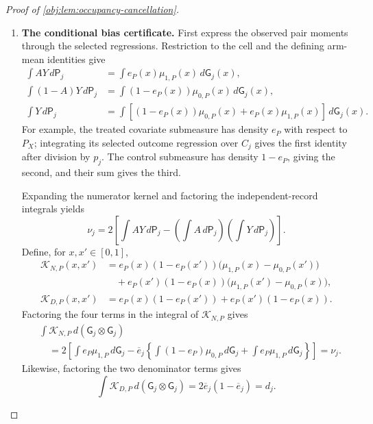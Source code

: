 \documentclass[11pt]{article}
\begin{document}
\begin{proof}[Proof of \cref{obj:lem:occupancy-cancellation}]
\begin{enumerate}
\item \textbf{The conditional bias certificate.}
First express the observed pair moments through the selected regressions. Restriction to the cell and the defining arm-mean identities give
\[
\begin{aligned}
\int AY\,d\mathsf P_j
&=\int e_P(x)\mu_{1,P}(x)\,d\mathsf G_j(x),\\
\int (1-A)Y\,d\mathsf P_j
&=\int (1-e_P(x))\mu_{0,P}(x)\,d\mathsf G_j(x),\\
\int Y\,d\mathsf P_j
&=\int\left[(1-e_P(x))\mu_{0,P}(x)
             +e_P(x)\mu_{1,P}(x)\right]\,d\mathsf G_j(x).
\end{aligned}
\]
For example, the treated covariate submeasure has density \(e_P\) with respect to \(P_X\); integrating its selected outcome regression over \(C_j\) gives the first identity after division by \(p_j\). The control submeasure has density \(1-e_P\), giving the second, and their sum gives the third.

Expanding the numerator kernel and factoring the independent-record integrals yields
\[
\nu_j
=
2\left[
\int AY\,d\mathsf P_j
-\left(\int A\,d\mathsf P_j\right)
 \left(\int Y\,d\mathsf P_j\right)
\right].
\]
Define, for \(x,x'\in[0,1]\),
\[
\begin{aligned}
\mathcal K_{N,P}(x,x')
&=
e_P(x)(1-e_P(x'))
 \bigl(\mu_{1,P}(x)-\mu_{0,P}(x')\bigr)\\
&\quad+
e_P(x')(1-e_P(x))
 \bigl(\mu_{1,P}(x')-\mu_{0,P}(x)\bigr),\\
\mathcal K_{D,P}(x,x')
&=
e_P(x)(1-e_P(x'))
+e_P(x')(1-e_P(x)).
\end{aligned}
\]
Factoring the four terms in the integral of \(\mathcal K_{N,P}\) gives
\[
\begin{aligned}
&\int\mathcal K_{N,P}\,d(\mathsf G_j\otimes\mathsf G_j)\\
&\quad=
2\left[
\int e_P\mu_{1,P}\,d\mathsf G_j
-\overline e_j
 \left\{
 \int(1-e_P)\mu_{0,P}\,d\mathsf G_j
 +\int e_P\mu_{1,P}\,d\mathsf G_j
 \right\}
\right]
=\nu_j.
\end{aligned}
\]
Likewise, factoring the two denominator terms gives
\[
\int\mathcal K_{D,P}\,d(\mathsf G_j\otimes\mathsf G_j)
=2\overline e_j(1-\overline e_j)=d_j.
\]


\end{enumerate}
\end{proof}
\end{document}
